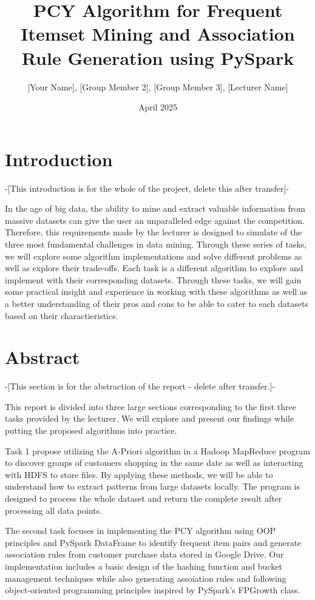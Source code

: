 \documentclass{article}
\title{PCY Algorithm for Frequent Itemset Mining and Association Rule Generation using PySpark}
\author{[Your Name], [Group Member 2], [Group Member 3], [Lecturer Name]}
\date{April 2025}
\begin{document}
\maketitle

\section{Introduction}
-[This introduction is for the whole of the project, delete this after transfer]-

In the age of big data, the ability to mine and extract valuable information from massive datasets can give the user an unparalleled edge against the competition. Therefore, this requirements made by the lecturer is designed to simulate of the three most fundamental challenges in data mining. Through these series of tasks, we will explore some algorithm implementations and solve different problems as well as explore their trade-offs. Each task is a different algorithm to explore and implement with their corresponding datasets. Through these tasks, we will gain some practical insight and experience in working with these algorithms as well as a better understanding of their pros and cons to be able to cater to each datasets based on their charactieristics. 


\section{Abstract}
-[This section is for the abstraction of the report - delete after transfer.]-

This report is divided into three large sections corresponding to the first three tasks provided by the lecturer. We will explore and present our findings while putting the proposed algorithms into practice.

Task 1 propose utilizing the A-Priori algorithm in a Hadoop MapReduce program to discover groups of customers shopping in the same date as well as interacting with HDFS to store files. By applying these methods, we will be able to understand how to extract patterns from large datasets locally. The program is designed to process the whole dataset and return the complete result after processing all data points.

The second task focuses in implementing the PCY algorithm using OOP principles and PySpark DataFrame to identify frequent item pairs and generate association rules from customer purchase data stored in Google Drive. Our implementation includes a basic design of the hashing function and bucket management techniques while also generating assoiation rules and following object-oriented programming principles inspired by PySpark's FPGrowth class.
\end{document}
